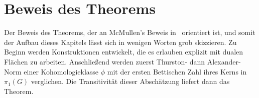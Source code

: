\section{Beweis des Theorems}
\label{sec:proofs}
Der Beweis des Theorems, der an McMullen's Beweis in~\cite{MCMULLEN.2002} orientiert ist, und somit der Aufbau dieses Kapitels lässt sich in wenigen Worten grob skizzieren. Zu Beginn werden Konstruktionen entwickelt, die es erlauben explizit mit dualen Flächen zu arbeiten. Anschließend werden zuerst Thurston- dann Alexander-Norm einer Kohomologieklasse $\phi$ mit der ersten Bettischen Zahl ihres Kerns in $\pi_1(G)$ verglichen. Die Transitivität dieser Abschätzung liefert dann das Theorem. 



